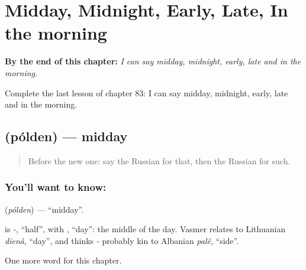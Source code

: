 
\chapter{Midday, Midnight, Early, Late, In the morning}
\label{ch:ru-midday-midnight-early-late-in-the-morning}

\begin{chapteropening}
\textbf{By the end of this chapter:} \emph{I can say midday, midnight, early, late and in the morning.}

Complete the last lesson of chapter 83: I can say midday, midnight, early, late and in the morning.
\end{chapteropening}

\section[\texorpdfstring{\ru{полдень} (pólden)}{полдень (pólden)}]{ (pólden) — midday}

\label{lesson:RU-C83-midday}



\begin{quote}
Before the new one: say the Russian for that, then the Russian for such.
\end{quote}

\subsection*{You'll want to know: }
\textbf{} (\emph{pólden}) — \textquotedblleft{}midday\textquotedblright{}.

\begin{cousinweb}
\textbf{} is \emph{-}, \textquotedblleft{}half\textquotedblright{}, with \emph{}, \textquotedblleft{}day\textquotedblright{}: the middle of the day. Vasmer relates \emph{} to Lithuanian \emph{dienà}, \textquotedblleft{}day\textquotedblright{}, and thinks \emph{-} probably kin to Albanian \emph{palë}, \textquotedblleft{}side\textquotedblright{}.
\end{cousinweb}

\begin{grammarlens}[title={What you've built}]
One more word for this chapter.
\end{grammarlens}

